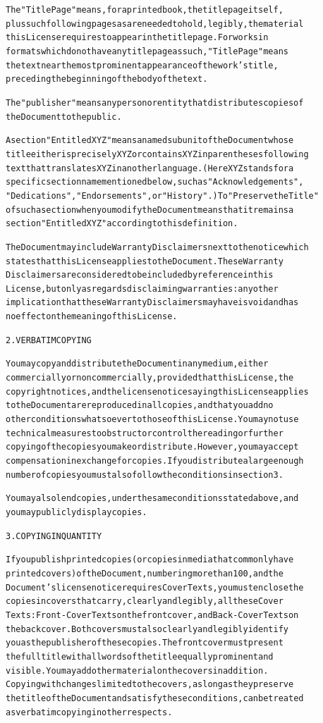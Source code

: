 \documentclass[DIV=12,%
               BCOR=0mm,%
               fontsize=10pt,%
               oneside,%
               paper=210mm:11in]{scrbook}
\begin{document}
\begin{alltt}
The "Title Page" means, for a printed book, the title page itself,
plus such following pages as are needed to hold, legibly, the material
this License requires to appear in the title page.  For works in
formats which do not have any title page as such, "Title Page" means
the text near the most prominent appearance of the work's title,
preceding the beginning of the body of the text.

The "publisher" means any person or entity that distributes copies of
the Document to the public.

A section "Entitled XYZ" means a named subunit of the Document whose
title either is precisely XYZ or contains XYZ in parentheses following
text that translates XYZ in another language.  (Here XYZ stands for a
specific section name mentioned below, such as "Acknowledgements",
"Dedications", "Endorsements", or "History".)  To "Preserve the Title"
of such a section when you modify the Document means that it remains a
section "Entitled XYZ" according to this definition.

The Document may include Warranty Disclaimers next to the notice which
states that this License applies to the Document.  These Warranty
Disclaimers are considered to be included by reference in this
License, but only as regards disclaiming warranties: any other
implication that these Warranty Disclaimers may have is void and has
no effect on the meaning of this License.

2. VERBATIM COPYING

You may copy and distribute the Document in any medium, either
commercially or noncommercially, provided that this License, the
copyright notices, and the license notice saying this License applies
to the Document are reproduced in all copies, and that you add no
other conditions whatsoever to those of this License.  You may not use
technical measures to obstruct or control the reading or further
copying of the copies you make or distribute.  However, you may accept
compensation in exchange for copies.  If you distribute a large enough
number of copies you must also follow the conditions in section 3.

You may also lend copies, under the same conditions stated above, and
you may publicly display copies.


3. COPYING IN QUANTITY

If you publish printed copies (or copies in media that commonly have
printed covers) of the Document, numbering more than 100, and the
Document's license notice requires Cover Texts, you must enclose the
copies in covers that carry, clearly and legibly, all these Cover
Texts: Front-Cover Texts on the front cover, and Back-Cover Texts on
the back cover.  Both covers must also clearly and legibly identify
you as the publisher of these copies.  The front cover must present
the full title with all words of the title equally prominent and
visible.  You may add other material on the covers in addition.
Copying with changes limited to the covers, as long as they preserve
the title of the Document and satisfy these conditions, can be treated
as verbatim copying in other respects.


\end{alltt}
\end{document}
